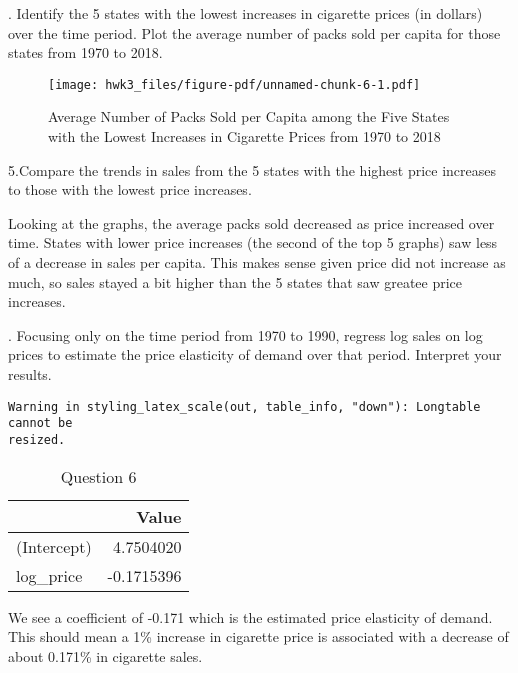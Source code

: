 \documentclass[
  letterpaper,
  DIV=11,
  numbers=noendperiod]{scrartcl}
\begin{document}
\newpage

. Identify the 5 states with the lowest increases in
cigarette prices (in dollars) over the time period. Plot the average
number of packs sold per capita for those states from 1970 to 2018.

\begin{figure}[H]

{\centering \texttt{[image: hwk3\_files/figure-pdf/unnamed-chunk-6-1.pdf]}

}

\caption{Average Number of Packs Sold per Capita among the Five States
with the Lowest Increases in Cigarette Prices from 1970 to 2018}

\end{figure}%

\newpage

\noindent 5.Compare the trends in sales from the 5 states with the
highest price increases to those with the lowest price increases.

Looking at the graphs, the average packs sold decreased as price
increased over time. States with lower price increases (the second of
the top 5 graphs) saw less of a decrease in sales per capita. This makes
sense given price did not increase as much, so sales stayed a bit higher
than the 5 states that saw greatee price increases.

\newpage

. Focusing only on the time period from 1970 to 1990, regress
log sales on log prices to estimate the price elasticity of demand over
that period. Interpret your results.

\begin{verbatim}
Warning in styling_latex_scale(out, table_info, "down"): Longtable cannot be
resized.
\end{verbatim}

\begin{longtable}[t]{lr}
\caption{Question 6}\tabularnewline

\toprule
 & Value\\
\midrule
(Intercept) & 4.7504020\\
log\_price & -0.1715396\\
\bottomrule
\end{longtable}

We see a coefficient of -0.171 which is the estimated price elasticity
of demand. This should mean a 1\% increase in cigarette price is
associated with a decrease of about 0.171\% in cigarette sales.
\end{document}
